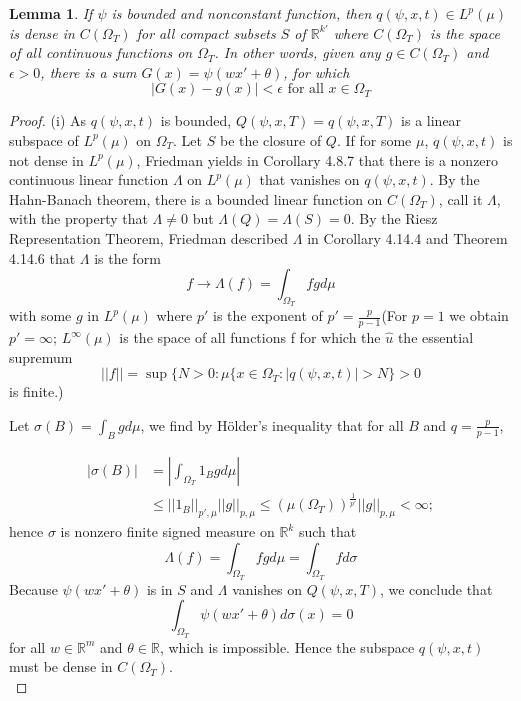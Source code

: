 \documentclass{article}
\newtheorem{lemma}{Lemma}[section]
\begin{document}
\begin{lemma}
	If $\psi$ is bounded and nonconstant function, then $q(\psi,x,t)\in L^p(\mu)$ is dense in $C(\Omega_{T})$ for all compact subsets $S$ of $\mathbb{R}^{k'}$ where $C(\Omega_{T})$ is the space of all continuous functions on $\Omega_{T}$. In other words, given any $g \in C(\Omega_{T})$ and $\epsilon > 0$, there is a sum $G(x)=\psi(wx'+\theta)$, for which
	\begin{equation}
	\left|G(x)-g(x)\right| < \epsilon \text{ for all $x\in \Omega_{T}$}
	\end{equation}
	 \label{dense_set}
\end{lemma}
\begin{proof}
	(i) As $q(\psi,x,t)$ is bounded, $Q(\psi,x,T)={q(\psi,x,T)}$ is a linear subspace of $L^{p}(\mu)$ on $\Omega_{T}$. 
Let $S$ be the closure of $Q$.
If for some $\mu$, $q(\psi,x,t)$ is not dense in $L^{p}(\mu)$, Friedman yields in Corollary 4.8.7 \cite{friedman} that there is a nonzero continuous linear function $\Lambda$ on $L^{p}(\mu)$ that vanishes on $q(\psi,x,t)$. 
By the Hahn-Banach theorem, there is a bounded linear function on $C(\Omega_{T})$, call it $\Lambda$, 
with the property that $\Lambda\neq 0$ but $\Lambda(Q)=\Lambda(S)=0$. 
By the Riesz Representation Theorem, Friedman described $\Lambda$ in Corollary 4.14.4 and Theorem 4.14.6 \cite{friedman} that $\Lambda$ is the form
	\[f \rightarrow \Lambda(f)=\int_{\Omega_{T}}fg d\mu\]
	with some $g$ in $L^{p}(\mu)$ where $p'$ is the exponent of $p'=\frac{p}{p-1}$(For $p=1$ we obtain $p' = \infty$; $L^{\infty}(\mu)$ is the space of all functions f for which the $\hat{u}$ the essential supremum
		\[||f|| =\sup\{N>0 : \mu \{x \in \Omega_{T} : |q(\psi,x,t)| > N\} > 0 \]
		is finite.)

		Let $\sigma(B) = \int_{B} g d\mu$, we find by H\"older's inequality that for all $B$ and $q=\frac{p}{p-1}$,

		\begin{equation}
		\begin{aligned}
		\left|\sigma(B)\right| &= \left|\int_{\Omega_{T}}1_{B}g d \mu\right|\\
		 & \leq ||1_{B}||_{p',\mu} ||g||_{p,\mu} \leq (\mu(\Omega_{T}))^{\frac{1}{p'}}||g||_{p,\mu} < \infty;
		 \end{aligned}
		\end{equation}
	     hence $\sigma$ is nonzero finite signed measure on $\mathbb R^{k}$ such that
	     \begin{equation}
	     \Lambda(f) =\int_{\Omega_{T}}fg d\mu =  \int_{\Omega_{T}}f d\sigma
	     \end{equation}
Because $\psi(wx'+\theta)$ is in $S$ and $\Lambda$ vanishes on $Q(\psi,x,T)$, we conclude that
	     \begin{equation}
	     \int_{\Omega_{T}} \psi(wx'+\theta)d \sigma(x) = 0
	    \end{equation}
	    for all $w \in\mathbb{R}^{m}$ and $\theta \in \mathbb{R}$, which is impossible.
Hence the subspace $q(\psi,x,t)$ must be dense in $C(\Omega_{T})$.\\


\end{proof}
\end{document}
